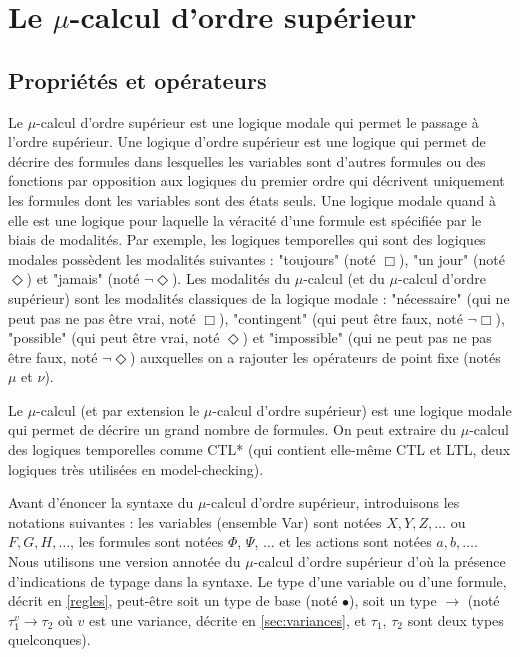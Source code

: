 \documentclass{rapport}
\theoremstyle{plain}
\theoremstyle{remark}
\theoremstyle{definition}
\begin{document}
\section{Le $\mu$-calcul d'ordre supérieur\label{sec:muCalcul}}

\subsection{Propriétés et opérateurs\label{sec:prop&op}}

Le $\mu$-calcul d'ordre supérieur est une logique modale qui permet le passage à l'ordre supérieur. Une logique d'ordre supérieur est une logique qui permet de décrire des formules dans lesquelles les variables sont d'autres formules ou des fonctions par opposition aux logiques du premier ordre qui décrivent uniquement les formules dont les variables sont des états seuls. Une logique modale quand à elle est une logique pour laquelle la véracité d'une formule est spécifiée par le biais de modalités. Par exemple, les logiques temporelles qui sont des logiques modales possèdent les modalités suivantes : "toujours" (noté $\Box$), "un jour" (noté $\Diamond$) et "jamais" (noté $\neg \Diamond$). Les modalités du $\mu$-calcul (et du $\mu$-calcul d'ordre supérieur) sont les modalités classiques de la logique modale : "nécessaire" (qui ne peut pas ne pas être vrai, noté $\Box$), "contingent" (qui peut être faux, noté $\neg \Box$), "possible" (qui peut être vrai, noté $\Diamond$) et "impossible" (qui ne peut pas ne pas être faux, noté $\neg \Diamond$) auxquelles on a rajouter les opérateurs de point fixe (notés $\mu$ et $\nu$).

Le $\mu$-calcul (et par extension le $\mu$-calcul d'ordre supérieur) est une logique modale qui permet de décrire un grand nombre de formules. On peut extraire du $\mu$-calcul des logiques temporelles comme CTL* (qui contient elle-même CTL et LTL, deux logiques très utilisées en model-checking). 

Avant d'énoncer la syntaxe du $\mu$-calcul d'ordre supérieur, introduisons les notations suivantes : les variables (ensemble Var) sont notées $X, Y, Z, \ldots$ ou $F, G, H, \ldots$, les formules sont notées $\Phi$, $\Psi$, $\ldots$ et les actions sont notées $a, b, \ldots$. Nous utilisons une version annotée du $\mu$-calcul d'ordre supérieur d'où la présence d'indications de typage dans la syntaxe. Le type d'une variable ou d'une formule, décrit en \ref{regles}, peut-être soit un type de base (noté $\bullet$), soit un type $\rightarrow$ (noté $\tau_1^{v} \rightarrow \tau_2$ où $v$ est une variance, décrite en \ref{sec:variances}, et $\tau_1$, $\tau_2$ sont deux types quelconques).
\end{document}
